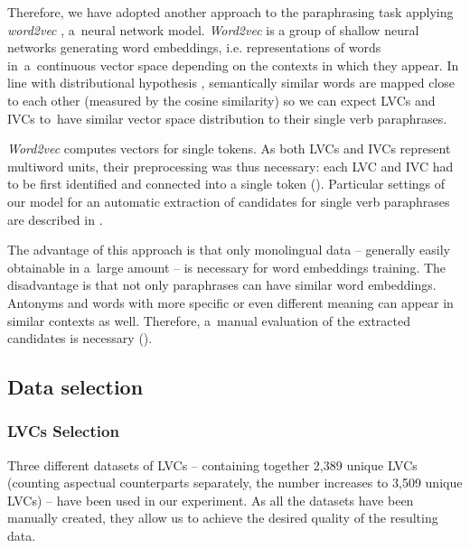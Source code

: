 \documentclass[output=paper
,modfonts
,nonflat]{langsci/langscibook}
\newcommand{\out}[1]{\textcolor[rgb]{0.8,0.8,0.8}{\textbf{#1}}}
\begin{document}

Therefore, we have adopted another approach to the paraphrasing task applying 
\emph{word2vec} \citep{mikolov2013}, a~neural network model. \emph{Word2vec} 
is a group of shallow neural networks generating word embeddings, i.e. 
representations  of words in~a~continuous vector space depending on the 
contexts in which they appear. In line with distributional hypothesis 
\citep{harris54}, semantically similar words are mapped close to each other 
(measured by the  cosine similarity) so we can expect LVCs and IVCs to~have 
similar vector space distribution to their single verb paraphrases. 

\emph{Word2vec} computes vectors for single tokens. As both LVCs and IVCs 
represent multiword units, their preprocessing was thus necessary: each LVC 
and IVC had to be first identified and connected into a single token 
(). Particular settings of our model for an automatic 
extraction of candidates for single verb paraphrases are described in 
.

The advantage of this approach is that only monolingual data -- generally 
easily obtainable in a~large amount -- is necessary for word embeddings 
training. The disadvantage is that not only paraphrases can have similar 
word embeddings. Antonyms and words with more specific or even different meaning 
can appear in similar contexts as well. Therefore, a~manual evaluation of the 
extracted candidates is necessary ().

\subsection{Data selection}
\label{sec:datasets}

\subsubsection{LVCs Selection}
\label{sect:lvc-selection}
Three different datasets of LVCs -- containing together 2,389 unique LVCs 
(counting aspectual counterparts separately, the number increases to 3,509 
unique LVCs) -- have been used in our experiment. As all the datasets have been 
manually created, they allow us to achieve the desired quality of the resulting 
data. 
\end{document}
